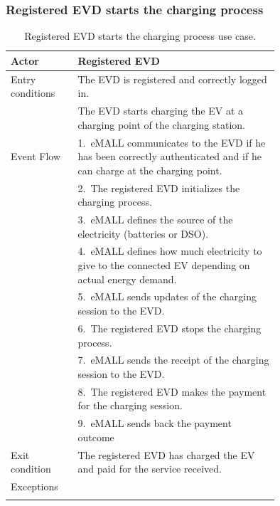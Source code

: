 \subsubsection*{Registered EVD starts the charging process}
\begin{center}
    \begin{longtable}{lp{0.75\linewidth}}
        \hline
        Actor            & Registered EVD                                                                                                       \\
        \hline
        Entry conditions & The EVD is registered and correctly logged in.                                                                       \\
        & The EVD starts charging the EV at a charging point of the charging station.                                          \\
        \hline
        Event Flow       & 1.\ eMALL communicates to the EVD if he has been correctly authenticated and if he can charge at the charging point. \\
        & 2.\ The registered EVD initializes the charging process.                                                             \\
        & 3.\ eMALL defines the source of the electricity (batteries or DSO).                                                  \\
        & 4.\ eMALL defines how much electricity to give to the connected EV depending on actual energy demand.                \\
        & 5.\ eMALL sends updates of the charging session to the EVD.                                                          \\
        & 6.\ The registered EVD stops the charging process.                                                                   \\
        & 7.\ eMALL sends the receipt of the charging session to the EVD.                                                      \\
        & 8.\ The registered EVD makes the payment for the charging session.                                                   \\
        & 9.\ eMALL sends back the payment outcome                                                                             \\
        \hline
        Exit condition   & The registered EVD has charged the EV and paid for the service received.                                             \\
        \hline
        Exceptions       &                                                                                                                      \\
        \hline
        \caption{Registered EVD starts the charging process use case.}
        \label{tab: EVD_charges_EV_use_case}
    \end{longtable}
\end{center}


